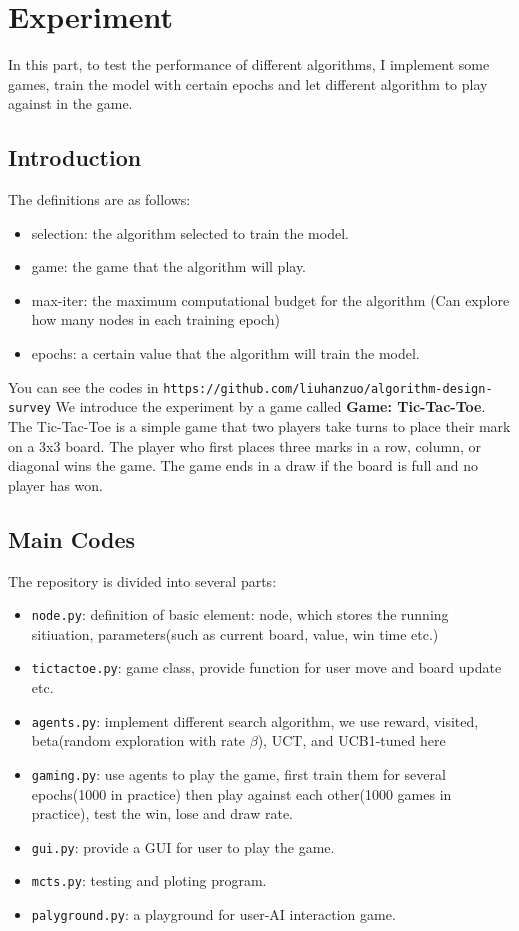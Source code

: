 \documentclass[11pt]{article}
\theoremstyle{definitionstyle}
\begin{document}
\section{Experiment}
In this part, to test the performance of different algorithms, I implement some games, train the model with certain epochs and let different algorithm to play against in the game.\\
\subsection{Introduction}
The definitions are as follows:
\begin{itemize}
    \item selection: the algorithm selected to train the model.
    \item game: the game that the algorithm will play.
    \item max-iter: the maximum computational budget for the algorithm (Can explore how many nodes in each training epoch)
    \item epochs: a certain value that the algorithm will train the model.
\end{itemize}
You can see the codes in \texttt{https://github.com/liuhanzuo/algorithm-design-survey}
We introduce the experiment by a game called \textbf{Game: Tic-Tac-Toe}.\\
The Tic-Tac-Toe is a simple game that two players take turns to place their mark on a 3x3 board. The player who first places three marks in a row, column, or diagonal wins the game. The game ends in a draw if the board is full and no player has won.\\
\subsection{Main Codes}
The repository is divided into several parts:
\begin{itemize}
    \item \texttt{node.py}: definition of basic element: node, which stores the running sitiuation, parameters(such as current board, value, win time etc.)
    \item \texttt{tictactoe.py}: game class, provide function for user move and board update etc.
    \item \texttt{agents.py}: implement different search algorithm, we use reward, visited, beta(random exploration with rate $\beta$), UCT, and UCB1-tuned here
    \item \texttt{gaming.py}: use agents to play the game, first train them for several epochs(1000 in practice) then play against each other(1000 games in practice), test the win, lose and draw rate.
    \item \texttt{gui.py}: provide a GUI for user to play the game.
    \item \texttt{mcts.py}: testing and ploting program.
    \item \texttt{palyground.py}: a playground for user-AI interaction game.
\end{itemize}
\end{document}
